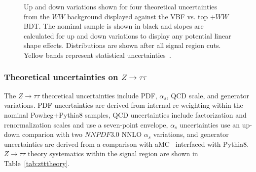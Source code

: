\begin{figure}[!h]
  \hfill
  \hfill
{\caption{Up and down variations shown for four theoretical uncertainties from the $WW$ background displayed against the VBF vs. top +$WW$ BDT. The nominal sample is shown in black and slopes are calculated for up and down variations to display any potential linear shape effects. Distributions are shown after all signal region cuts. Yellow bands represent statistical uncertainties~\cite{ourSupportNote}.
\label{fig:wwtheor}}}
\end{figure}

\subsubsection{Theoretical uncertainties on $Z\rightarrow\tau\tau$}

The $Z\rightarrow\tau\tau$ theoretical uncertainties include PDF, $\alpha_s$, QCD scale, and generator variations. PDF uncertainties are derived from internal re-weighting within the nominal Powheg$+$Pythia8 samples, QCD uncertainties include factorization and renormalization scales and use a seven-point envelope, $\alpha_s$ uncertainties use an up-down comparion with two $NNPDF3.0$ NNLO $\alpha_s$ variations, and generator uncertainties are derived from a comparison with aMC\@NLO~\cite{MG5} interfaced with Pythia8. $Z\rightarrow\tau\tau$ theory systematics within the signal region are shown in Table~\ref{tab:ztttheory}.

